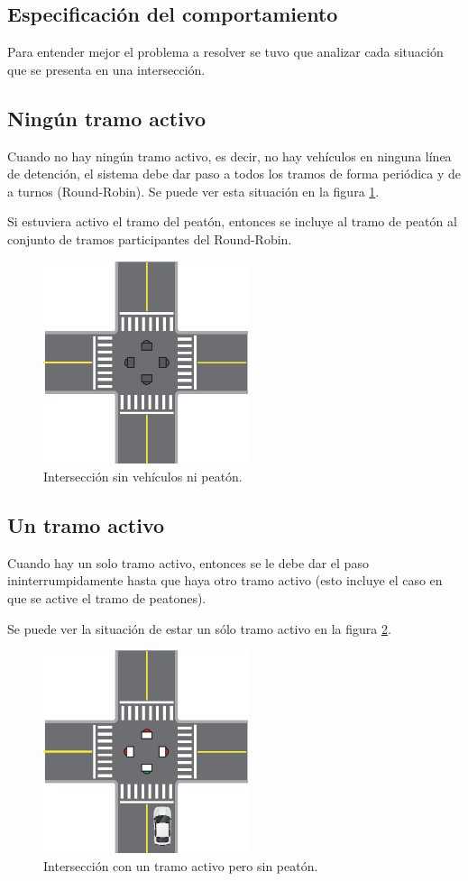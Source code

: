 \subsection{Especificación del comportamiento}\label{sec:spec}
Para entender mejor el problema a resolver se tuvo que analizar cada situación que se presenta en una intersección.
\subsection{Ningún tramo activo}
Cuando no hay ningún tramo activo, es decir, no hay vehículos en ninguna línea de detención, el sistema debe dar paso a todos los tramos de forma periódica y de a turnos (Round-Robin). Se puede ver esta situación en la figura \ref{fig:ningun-activo}.

Si estuviera activo el tramo del peatón, entonces se incluye al tramo de peatón al conjunto de tramos participantes del Round-Robin.

\begin{figure}[htbp]
	\centering
	\includegraphics[width=6cm]{imagenes/ningun-activo.eps}
	\caption{Intersección sin vehículos ni peatón.}
	\label{fig:ningun-activo}
\end{figure}

\subsection{Un tramo activo}
Cuando hay un solo tramo activo, entonces se le debe dar el paso ininterrumpidamente hasta que haya otro tramo activo (esto incluye el caso en que se active el tramo de peatones).

Se puede ver la situación de estar un sólo tramo activo en la figura \ref{fig:un-activo}.

\begin{figure}[htbp]
	\centering
	\includegraphics[width=6cm]{imagenes/un-activo.eps}
	\caption{Intersección con un tramo activo pero sin peatón.}
	\label{fig:un-activo}
\end{figure}


